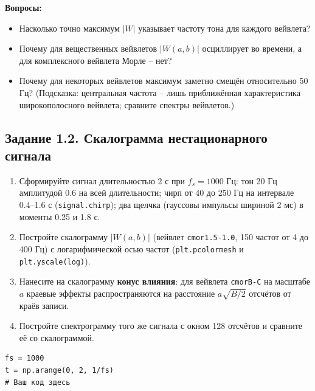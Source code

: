 \documentclass[12pt,a4paper,openany]{book}
\providecommand{\tightlist}{\setlength{\itemsep}{0pt}\setlength{\parskip}{0pt}}
\begin{document}
\textbf{Вопросы:}

\begin{itemize}
\tightlist
\item
  Насколько точно максимум \(|W|\) указывает частоту тона для каждого вейвлета?
\item
  Почему для вещественных вейвлетов \(|W(a,b)|\) осциллирует во времени, а для комплексного вейвлета Морле -- нет?
\item
  Почему для некоторых вейвлетов максимум заметно смещён относительно 50 Гц? (Подсказка: центральная частота -- лишь приближённая характеристика широкополосного вейвлета; сравните спектры вейвлетов.)
\end{itemize}

\subsection*{Задание 1.2. Скалограмма нестационарного сигнала}

\begin{enumerate}
\def\labelenumi{\arabic{enumi}.}
\tightlist
\item
  Сформируйте сигнал длительностью 2 с при \(f_s = 1000\) Гц: тон 20 Гц амплитудой 0.6 на всей длительности; чирп от 40 до 250 Гц на интервале 0.4--1.6 с (\texttt{signal.\allowbreak{}chirp}); два щелчка (гауссовы импульсы шириной 2 мс) в моменты 0.25 и 1.8 с.
\item
  Постройте скалограмму \(|W(a,b)|\) (вейвлет \texttt{\textquotesingle{}\allowbreak{}cmor1.\allowbreak{}5-1.\allowbreak{}0\textquotesingle{}\allowbreak{}}, 150 частот от 4 до 400 Гц) с логарифмической осью частот (\texttt{plt.\allowbreak{}pcolormesh} и \texttt{plt.\allowbreak{}yscale(\allowbreak{}\textquotesingle{}\allowbreak{}log\textquotesingle{}\allowbreak{})}).
\item
  Нанесите на скалограмму \textbf{конус влияния}: для вейвлета \texttt{cmorB-C} на масштабе \(a\) краевые эффекты распространяются на расстояние \(a\sqrt{B/2}\) отсчётов от краёв записи.
\item
  Постройте спектрограмму того же сигнала с окном 128 отсчётов и сравните её со скалограммой.
\end{enumerate}

\begin{Verbatim}[fontsize=\small, breaklines, breakanywhere, frame=single, framesep=2mm]
fs = 1000
t = np.arange(0, 2, 1/fs)
# Ваш код здесь
\end{Verbatim}
\end{document}
